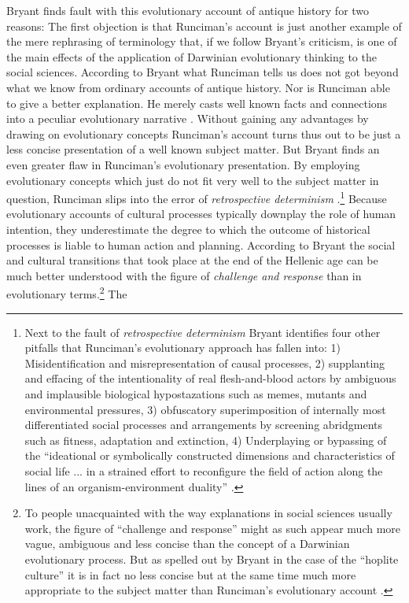 Bryant finds fault with this evolutionary account of antique history
for two reasons: The first objection is that Runciman's account is
just another example of the mere rephrasing of terminology that, if we
follow Bryant's criticism, is one of the main effects of the
application of Darwinian evolutionary thinking to the social
sciences. According to Bryant what Runciman tells us does not got
beyond what we know from ordinary accounts of antique history. Nor is
Runciman able to give a better explanation. He merely casts well known
facts and connections into a peculiar evolutionary narrative
\cite[p.\ 470]{bryant:2004}. Without gaining any advantages by drawing
on evolutionary concepts Runciman's account turns thus out to be just
a less concise presentation of a well known subject matter.  But
Bryant finds an even greater flaw in Runciman's evolutionary
presentation. By employing evolutionary concepts which just do not fit
very well to the subject matter in question, Runciman slips into the
error of {\em retrospective determinism} \cite[p.\ 
478]{bryant:2004}.\footnote{Next to the fault of {\em retrospective
    determinism} Bryant identifies four other pitfalls that Runciman's
  evolutionary approach has fallen into: 1) Misidentification and
  misrepresentation of causal processes, 2) supplanting and effacing
  of the intentionality of real flesh-and-blood actors by ambiguous
  and implausible biological hypostazations such as memes, mutants and
  environmental pressures, 3) obfuscatory superimposition of
  internally most differentiated social processes and arrangements by
  screening abridgments such as fitness, adaptation and extinction, 4)
  Underplaying or bypassing of the ``ideational or symbolically
  constructed dimensions and characteristics of social life ... in a
  strained effort to reconfigure the field of action along the lines
  of an organism-environment duality'' \cite[p.\ 481]{bryant:2004}.}
Because evolutionary accounts of cultural processes typically downplay
the role of human intention, they underestimate the degree to which the
outcome of historical processes is liable to human action and
planning.  According to Bryant the social and cultural transitions
that took place at the end of the Hellenic age can be much better
understood with the figure of {\em challenge and response} than in
evolutionary terms.\footnote{To people unacquainted with the way
  explanations in social sciences usually work, the figure of
  ``challenge and response'' might as such appear much more vague,
  ambiguous and less concise than the concept of a Darwinian
  evolutionary process. But as spelled out by Bryant in the case of
  the ``hoplite culture'' it is in fact no less concise but at the
  same time much more appropriate to the subject matter than
  Runciman's evolutionary account \cite[p.\  470ff.]{bryant:2004}.} The
